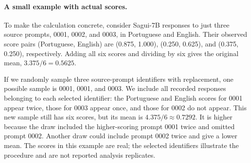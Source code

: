 \paragraph*{A small example with actual scores.} To make the calculation concrete, consider Sagui-7B responses to just three source prompts, 0001, 0002, and 0003, in Portuguese and English. Their observed score pairs (Portuguese, English) are (0.875, 1.000), (0.250, 0.625), and (0.375, 0.250), respectively. Adding all six scores and dividing by six gives the original mean, $3.375/6 = 0.5625$.

If we randomly sample three source-prompt identifiers with replacement, one possible sample is 0001, 0001, and 0003. We include all recorded responses belonging to each selected identifier: the Portuguese and English scores for 0001 appear twice, those for 0003 appear once, and those for 0002 do not appear. This new sample still has six scores, but its mean is $4.375/6 \approx 0.7292$. It is higher because the draw included the higher-scoring prompt 0001 twice and omitted prompt 0002. Another draw could include prompt 0002 twice and give a lower mean. The scores in this example are real; the selected identifiers illustrate the procedure and are not reported analysis replicates.
